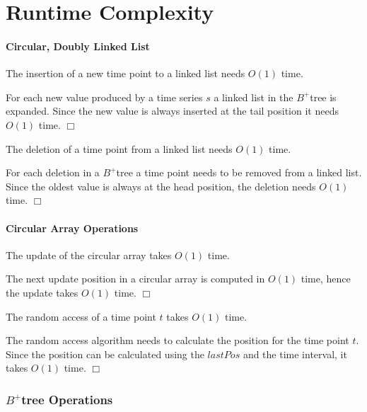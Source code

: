 \documentclass[abstracton,12pt,oneside]{scrreprt}
\newenvironment{proof}
  {\noindent{\bf Proof:\rm}}{\hfill$\Box$\vspace{\medskipamount}}
\begin{document}
\section{Runtime Complexity}

\paragraph{Circular, Doubly Linked List}
\begin{mydef}
	The insertion of a new time point to a linked list needs $O(1)$ time.
	\label{circ:def1}
\end{mydef}
\begin{proof}
	For each new value produced by a time series $s$ a linked list in the $B^+$tree is expanded. Since the new value is always inserted at the tail position it needs $O(1)$ time.
\end{proof}
\begin{mydef}
	The deletion of a time point from a linked list needs $O(1)$ time.
	\label{circ:def2}
\end{mydef}
\begin{proof}
	For each deletion in a $B^+$tree a time point needs to be removed from a linked list. Since the oldest value is always at the head position, the deletion needs $O(1)$ time.
\end{proof}


\paragraph{Circular Array Operations}
\begin{mydef}
	The update of the circular array takes $O(1)$ time.
	\label{updateAC}
\end{mydef}
\begin{proof}
	The next update position in a circular array is computed in $O(1)$ time, hence the update takes $O(1)$ time. 
\end{proof}
\begin{mydef}
	The random access of a time point $t$ takes $O(1)$ time.
\end{mydef}
\begin{proof}
	The random access algorithm needs to calculate the position for the time point $t$. Since the position can be calculated using the $lastPos$ and the time interval, it takes $O(1)$ time.
\end{proof}

\subsubsection{$B^+$tree Operations}
\end{document}
